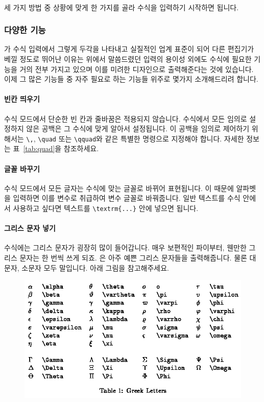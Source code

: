 \paragraph{}
세 가지 방법 중 상황에 맞게 한 가지를 골라 수식을 입력하기 시작하면 됩니다.

\subsubsection{다양한 기능}
\label{subsec:ams-func}
\lt 가 수식 입력에서 그렇게 두각을 나타내고 실질적인 업계 표준이 되어 다른 편집기가 베낄 정도로 뛰어난 이유는 위에서 말씀드렸던 입력의 용이성 외에도 수식에 필요한 기능을 거의 전부 가지고 있으며 이를 미려한 디자인으로 출력해준다는 것에 있습니다.
이제 그 많은 기능들 중 자주 필요로 하는 기능들 위주로 몇가지 소개해드리려 합니다.

\paragraph{빈칸 띄우기}
수식 모드에서 단순한 빈 칸과 줄바꿈은 적용되지 않습니다.
수식에서 모든 임의로 설정하지 않은 공백은 그 수식에 맞게 알아서 설정됩니다.
이 공백을 임의로 제어하기 위해서는  \verb|\,|, \verb|\quad| 또는 \verb|\qquad|와 같은 특별한 명령으로 지정해야 합니다.
자세한 정보는 표~\ref{tab:quad}을 참조하세요.

\paragraph{글꼴 바꾸기}
수식 모드에서 모든 글자는 수식에 맞는 글꼴로 바뀌어 표현됩니다.
이 때문에 알파벳을 입력하면 이를 변수로 취급하여 변수 글꼴로 바꿔줍니다.
일반 텍스트를 수식 안에서 사용하고 싶다면 텍스트를 \verb|\textrm{...}| 안에 넣으면 됩니다.

\paragraph{그리스 문자 넣기}
수식에는 그리스 문자가 굉장히 많이 들어갑니다.
매우 보편적인 파이부터, 웬만한 그리스 문자는 한 번씩 쓰게 되죠.
\lt 은 아주 예쁜 그리스 문자들을 출력해줍니다.
물론 대문자, 소문자 모두 말입니다.
아래 그림을 참고해주세요.

\begin{figure}[h]
	\includegraphics[width=\textwidth]{figures/t1.png}
\end{figure}

